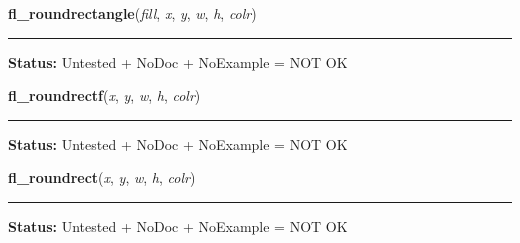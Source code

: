     \label{xformslib:library:fl_roundrectangle}

    \vspace{0.5ex}

\hspace{.8\funcindent}\begin{boxedminipage}{\funcwidth}

    \raggedright \textbf{fl\_roundrectangle}(\textit{fill}, \textit{x}, \textit{y}, \textit{w}, \textit{h}, \textit{colr})

    \vspace{-1.5ex}

    \rule{\textwidth}{0.5\fboxrule}
\setlength{\parskip}{2ex}
\setlength{\parskip}{1ex}
\textbf{Status:} Untested + NoDoc + NoExample = NOT OK



    \end{boxedminipage}

    \label{xformslib:library:fl_roundrectf}

    \vspace{0.5ex}

\hspace{.8\funcindent}\begin{boxedminipage}{\funcwidth}

    \raggedright \textbf{fl\_roundrectf}(\textit{x}, \textit{y}, \textit{w}, \textit{h}, \textit{colr})

    \vspace{-1.5ex}

    \rule{\textwidth}{0.5\fboxrule}
\setlength{\parskip}{2ex}
\setlength{\parskip}{1ex}
\textbf{Status:} Untested + NoDoc + NoExample = NOT OK



    \end{boxedminipage}

    \label{xformslib:library:fl_roundrect}

    \vspace{0.5ex}

\hspace{.8\funcindent}\begin{boxedminipage}{\funcwidth}

    \raggedright \textbf{fl\_roundrect}(\textit{x}, \textit{y}, \textit{w}, \textit{h}, \textit{colr})

    \vspace{-1.5ex}

    \rule{\textwidth}{0.5\fboxrule}
\setlength{\parskip}{2ex}
\setlength{\parskip}{1ex}
\textbf{Status:} Untested + NoDoc + NoExample = NOT OK



    \end{boxedminipage}

